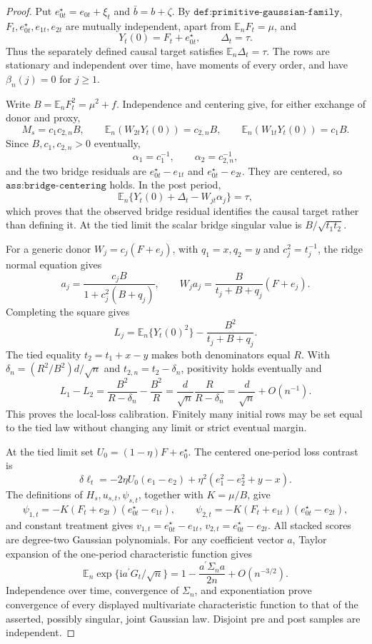 \documentclass{article}
\begin{document}
\begin{proof}
Put \(e_{0t}^{\star}=e_{0t}+\xi_t\) and \(\bar b=b+\zeta\).  By \(\texttt{def:primitive-gaussian-family}\), \(F_t,e_{0t}^{\star},e_{1t},e_{2t}\) are mutually independent, apart from \(\mathbb E_nF_t=\mu\), and
\[
 Y_t(0)=F_t+e_{0t}^{\star},\qquad \Delta_t=\tau.
\]
Thus the separately defined causal target satisfies \(\mathbb E_n\Delta_t=\tau\).  The rows are stationary and independent over time, have moments of every order, and have \(\beta_n(j)=0\) for \(j\geq1\).

Write \(B=\mathbb E_nF_t^2=\mu^2+f\).  Independence and centering give, for either exchange of donor and proxy,
\[
 M_s=c_1c_{2,n}B,\qquad
 \mathbb E_n(W_{2t}Y_t(0))=c_{2,n}B,\qquad
 \mathbb E_n(W_{1t}Y_t(0))=c_1B.
\]
Since \(B,c_1,c_{2,n}>0\) eventually,
\[
 \alpha_1=c_1^{-1},\qquad \alpha_2=c_{2,n}^{-1},
\]
and the two bridge residuals are \(e_{0t}^{\star}-e_{1t}\) and \(e_{0t}^{\star}-e_{2t}\).  They are centered, so \(\texttt{ass:bridge-centering}\) holds.  In the post period,
\[
 \mathbb E_n\{Y_t(0)+\Delta_t-W_{jt}\alpha_j\}=\tau,
\]
which proves that the observed bridge residual identifies the causal target rather than defining it.  At the tied limit the scalar bridge singular value is \(B/\sqrt{t_1t_2}\).

For a generic donor \(W_j=c_j(F+e_j)\), with \(q_1=x,q_2=y\) and \(c_j^2=t_j^{-1}\), the ridge normal equation gives
\[
 a_j=\frac{c_jB}{1+c_j^2(B+q_j)},
 \qquad
 W_ja_j=\frac{B}{t_j+B+q_j}(F+e_j).
\]
Completing the square gives
\[
 L_j=\mathbb E_n\{Y_t(0)^2\}-\frac{B^2}{t_j+B+q_j}.
\]
The tied equality \(t_2=t_1+x-y\) makes both denominators equal \(R\).  With \(\delta_n=(R^2/B^2)d/\sqrt n\) and \(t_{2,n}=t_2-\delta_n\), positivity holds eventually and
\[
 L_1-L_2=\frac{B^2}{R-\delta_n}-\frac{B^2}{R}
 =\frac d{\sqrt n}\frac{R}{R-\delta_n}
 =\frac d{\sqrt n}+O(n^{-1}).
\]
This proves the local-loss calibration.  Finitely many initial rows may be set equal to the tied law without changing any limit or strict eventual margin.

At the tied limit set \(U_0=(1-\eta)F+e_0^{\star}\).  The centered one-period loss contrast is
\[
 \delta\ell_t=-2\eta U_0(e_1-e_2)+\eta^2(e_1^2-e_2^2+y-x).
\]
The definitions of \(H_s,u_{s,t},\psi_{s,t}\), together with \(K=\mu/B\), give
\[
 \psi_{1,t}=-K(F_t+e_{2t})(e_{0t}^{\star}-e_{1t}),
 \qquad
 \psi_{2,t}=-K(F_t+e_{1t})(e_{0t}^{\star}-e_{2t}),
\]
and constant treatment gives \(v_{1,t}=e_{0t}^{\star}-e_{1t}\), \(v_{2,t}=e_{0t}^{\star}-e_{2t}\).  All stacked scores are degree-two Gaussian polynomials.  For any coefficient vector \(a\), Taylor expansion of the one-period characteristic function gives
\[
 \mathbb E_n\exp\{\mathrm ia^{\prime}G_t/\sqrt n\}
 =1-\frac{a^{\prime}\Sigma_na}{2n}+O(n^{-3/2}).
\]
Independence over time, convergence of \(\Sigma_n\), and exponentiation prove convergence of every displayed multivariate characteristic function to that of the asserted, possibly singular, joint Gaussian law.  Disjoint pre and post samples are independent.


\end{proof}
\end{document}
